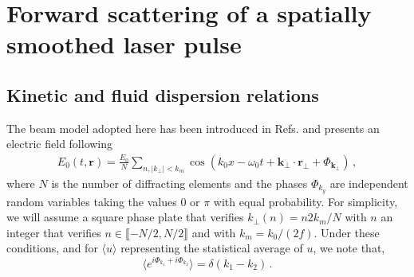 \documentclass[
 reprint,
 amsmath,amssymb,
 aps,
]{revtex4-1}
\begin{document}
\section{Forward scattering of a spatially smoothed laser pulse}
\subsection{Kinetic and fluid dispersion relations}
The  beam model adopted here has been introduced in  Refs. \cite[]{POF_Schmitt_88,POF_Rose_93} and presents an electric field following
 \begin{align}
E_0(t,\mathbf{r})  = \frac{E_0}{N} \sum_{n,\vert k_{\perp}\vert<k_m }  \cos(k_0x - \omega_0t +\mathbf{k}_\perp \cdot \mathbf{r}_\perp +\Phi_{\mathbf{k}_\perp})\, , \label{eq:erpp}
 \end{align}
 where  $N$ is the number of diffracting elements and the phases $\Phi_{k_y}$ are  independent random variables taking the values $0$ or $\pi$ with equal probability.
 For simplicity, we will assume a square phase plate that verifies $k_{\perp}(n) = n2k_m/N$ with $n$ an integer that verifies $n\in \llbracket - N/2 ,N/2 \rrbracket$ and with $k_m = k_0/(2f)$. 
 Under these conditions, and for $\langle u\rangle$ representing the statistical average of $u$,  we note   that,
 \begin{equation}\label{eq:d}
 \langle e^{i\Phi_{k_1}+i\Phi_{k_2}}\rangle=\delta(k_1-k_2) \, .
 \end{equation}
\end{document}
